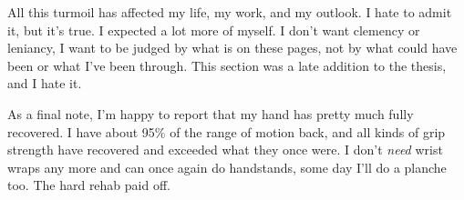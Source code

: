 All this turmoil has affected my life, my work, and my outlook. I hate to admit it, but it's true. I expected a lot more of myself. I don't want clemency or leniancy, I want to be judged by what is on these pages, not by what could have been or what I've been through. This section was a late addition to the thesis, and I hate it.

As a final note, I'm happy to report that my hand has pretty much fully recovered. I have about 95\% of the range of motion back, and all kinds of grip strength have recovered and exceeded what they once were. I don't \emph{need} wrist wraps any more and can once again do handstands, some day I'll do a planche too. The hard rehab paid off.
\savearabiccounter
